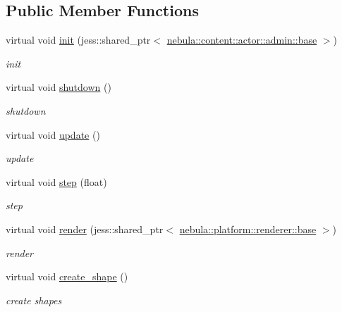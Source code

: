 \subsection*{Public Member Functions}
\begin{DoxyCompactItemize}
\item 
virtual void \hyperlink{classnebula_1_1content_1_1actor_1_1physics_1_1physx_1_1base_a44f695bfb034dae049191b2668a97c70}{init} (jess::shared\_\-ptr$<$ \hyperlink{classnebula_1_1content_1_1actor_1_1admin_1_1base}{nebula::content::actor::admin::base} $>$)
\begin{DoxyCompactList}\small\item\em init \item\end{DoxyCompactList}\item 
virtual void \hyperlink{classnebula_1_1content_1_1actor_1_1physics_1_1physx_1_1base_a35c49f55a68b66eb88f46a8916f54d4c}{shutdown} ()
\begin{DoxyCompactList}\small\item\em shutdown \item\end{DoxyCompactList}\item 
virtual void \hyperlink{classnebula_1_1content_1_1actor_1_1physics_1_1physx_1_1base_a44919981abb6410c7c635d6e1ea96423}{update} ()
\begin{DoxyCompactList}\small\item\em update \item\end{DoxyCompactList}\item 
virtual void \hyperlink{classnebula_1_1content_1_1actor_1_1physics_1_1physx_1_1base_ac9cab33b0b85222cd24c0238fadb6b85}{step} (float)
\begin{DoxyCompactList}\small\item\em step \item\end{DoxyCompactList}\item 
virtual void \hyperlink{classnebula_1_1content_1_1actor_1_1physics_1_1physx_1_1base_a9354c5be1ef0900bc013f8b215f1a6b3}{render} (jess::shared\_\-ptr$<$ \hyperlink{classnebula_1_1platform_1_1renderer_1_1base}{nebula::platform::renderer::base} $>$)
\begin{DoxyCompactList}\small\item\em render \item\end{DoxyCompactList}\item 
virtual void \hyperlink{classnebula_1_1content_1_1actor_1_1physics_1_1physx_1_1base_a1468fd6d256631892912ecec7f236c01}{create\_\-shape} ()
\begin{DoxyCompactList}\small\item\em create shapes \item\end{DoxyCompactList}\end{DoxyCompactItemize}
